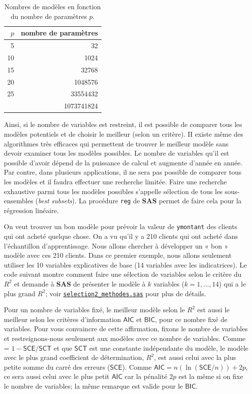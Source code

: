 \documentclass[
  11pt,
  letterpaper,
]{book}
\theoremstyle{definition}
\theoremstyle{definition}
\theoremstyle{definition}
\theoremstyle{remark}
\begin{document}
\begin{table}

\caption{\label{tab:02-table3}Nombres de modèles en fonction du nombre de paramètres $p$.}
\centering
\begin{tabular}[t]{rr}
\toprule
$p$ & nombre de paramètres\\
\midrule
5 & 32\\
10 & 1024\\
15 & 32768\\
20 & 1048576\\
25 & 33554432\\
\addlinespace
30 & 1073741824\\
\bottomrule
\end{tabular}
\end{table}

Ainsi, si le nombre de variables est restreint, il est possible de comparer tous les modèles potentiels et de choisir le meilleur (selon un critère). II existe même des algorithmes très efficaces qui permettent de trouver le meilleur modèle sans devoir examiner tous les modèles possibles. Le nombre de variables qu'il est possible d'avoir dépend de la puissance de calcul et augmente d'année en année. Par contre, dans plusieurs applications, il ne sera pas possible de comparer tous les modèles et il faudra effectuer une recherche limitée. Faire une recherche exhaustive parmi tous les modèles possibles s'appelle sélection de tous les sous-ensembles (\emph{best subsets}). La procédure \texttt{reg} de \textbf{SAS} permet de faire cela pour la régression linéaire.

On veut trouver un bon modèle pour prévoir la valeur de \texttt{ymontant} des clients qui ont acheté quelque chose. On a vu qu'il y a 210 clients qui ont acheté dans l'échantillon d'apprentissage. Nous allons chercher à développer un « bon » modèle avec ces 210 clients. Dans ce premier exemple, nous allons seulement utiliser les 10 variables explicatives de base (14 variables avec les indicatrices). Le code suivant montre comment faire une sélection de variables selon le critère du \(R^2\) et demande à \textbf{SAS} de présenter le modèle à \(k\) variables (\(k=1, \ldots, 14\)) qui a le plus grand \(R^2\); voir \href{https://raw.githubusercontent.com/lbelzile/math60602/master/documents/codeSAS/selection2_methodes.sas}{\texttt{selection2\_methodes.sas}} pour plus de détails.

Pour un nombre de variables fixé, le meilleur modèle selon le \(R^2\) est aussi le meilleur selon les critères d'information \(\mathsf{AIC}\) et \(\mathsf{BIC}\), pour ce nombre fixé de variables. Pour vous convaincre de cette affirmation, fixons le nombre de variables et restreignons-nous seulement aux modèles avec ce nombre de variables. Comme = \(1 - \mathsf{SCE}/\mathsf{SCT}\) et que \(\mathsf{SCT}\) est une constante indépendante du modèle, le modèle avec le plus grand coefficient de détermination, \(R^2\), est aussi celui avec la plus petite somme du carré des erreurs (\(\mathsf{SCE}\)). Comme \(\mathsf{AIC}=n (\ln (\mathsf{SCE}/n)) + 2p\), ce sera aussi celui avec le plus petit \(\mathsf{AIC}\) car la pénalité \(2p\) est la même si on fixe le nombre de variables; la même remarque est valide pour le \(\mathsf{BIC}\).
\end{document}
